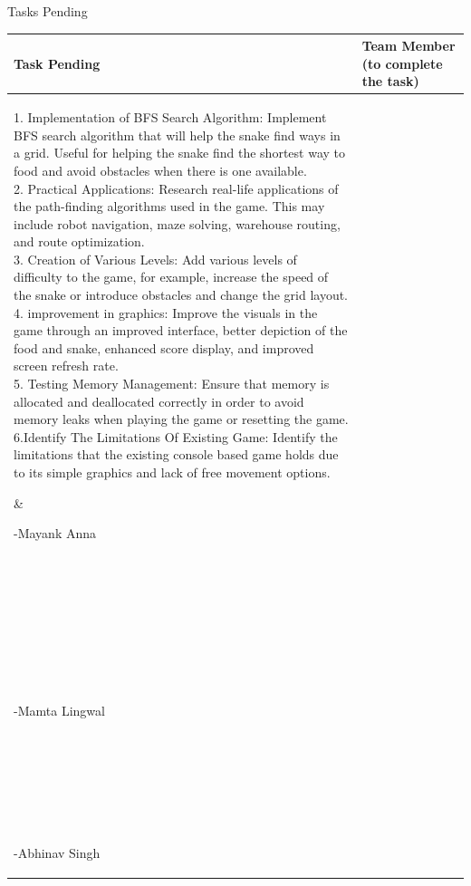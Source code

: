 \documentclass[12pt,a4paper]{article}
\newcommand{\sectiontitle}[1]{%
    {\color{GEUBlue}
    \fontsize{18}{22}\selectfont #1}
}
\begin{document}
\vspace{0.65cm}

\sectiontitle{Tasks Pending }

\vspace{0.05cm}

\vspace{0.18cm}

\begin{tabularx}{\textwidth}{
|>{\raggedright\arraybackslash}X
|>{\raggedright\arraybackslash}X|
}
\hline

\textbf{Task Pending} &
\textbf{Team Member (to complete the task)}
\\
\hline

\parbox[t][14.25cm][t]{\linewidth}{1. Implementation of BFS Search Algorithm: Implement BFS search algorithm that will help the snake find ways in a grid. Useful for helping the snake find the shortest way to food and avoid obstacles when there is one available.\\
2. Practical Applications: Research real-life applications of the path-finding algorithms used in the game. This may include robot navigation, maze solving, warehouse routing, and route optimization.\\

3. Creation of Various Levels: Add various levels of difficulty to the game, for example, increase the speed of the snake or introduce obstacles and change the grid layout.\\
4. improvement in graphics: Improve the visuals in the game through an improved interface, better depiction of the food and snake, enhanced score display, and improved screen refresh rate.\\

5. Testing Memory Management: Ensure that memory is allocated and deallocated correctly in order to avoid memory leaks when playing the game or resetting the game.\\
6.Identify The Limitations Of Existing Game: Identify the limitations that the existing console based game holds due to its simple graphics and lack of free movement options.
}
&
\parbox[t][1.25cm][t]{\linewidth}{-Mayank Anna\\
\\
\\
\\
\\
\\
\\
\\
\\
\\

-Mamta Lingwal\\
\\
\\
\\
\\
\\
\\
\\

-Abhinav Singh\\}
\\
\hline

\end{tabularx}
\end{document}
